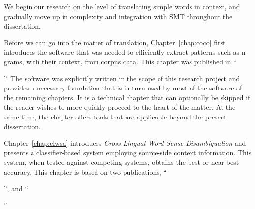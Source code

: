We begin our research on the level of translating simple words in context, and
gradually move up in complexity and integration with SMT throughout the
dissertation.

{\nobibliography*
Before we can go into the matter of translation, Chapter~\ref{chap:coco} first introduces the software that was needed
to efficiently extract patterns such as n-grams, with their context, from corpus data. This chapter was published in
``{\footnotesize\begin{NoHyper}\end{NoHyper}}''. The software
was explicitly written in the scope of this research project and provides a necessary foundation that is in turn used by most of the
software of the remaining chapters. It is a technical chapter that can optionally be skipped if the
reader wishes to more quickly proceed to the heart of the matter. At the same time, the chapter offers tools that are
applicable beyond the present dissertation.

Chapter~\ref{chap:clwsd} introduces \emph{Cross-Lingual Word Sense
Disambiguation} and presents a classifier-based system employing source-side
context information. This system, when tested against competing systems, obtains the
best or near-best accuracy. This chapter is based on two publications,
``\begin{NoHyper}{\footnotesize{}}'', and ``{\footnotesize{}}\end{NoHyper}''

}
